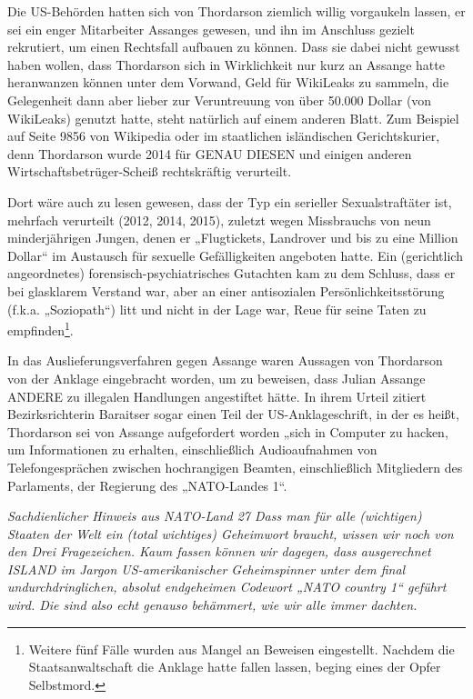 \begin{multicols}{2}
Die US-Behörden hatten sich von Thordarson ziemlich
willig vorgaukeln lassen, er sei ein enger Mitarbeiter Assanges gewesen, und ihn im Anschluss gezielt rekrutiert,
um einen Rechtsfall aufbauen zu können. Dass sie dabei nicht gewusst haben wollen, dass Thordarson sich
in Wirklichkeit nur kurz an Assange hatte heranwanzen
können unter dem Vorwand, Geld für WikiLeaks zu sammeln, die Gelegenheit dann aber lieber zur Veruntreuung von über 50.000 Dollar (von WikiLeaks) genutzt hatte, steht natürlich auf einem anderen Blatt. Zum Beispiel
auf Seite 9856 von Wikipedia oder im staatlichen isländischen Gerichtskurier, denn Thordarson wurde 2014 für
GENAU DIESEN und einigen anderen Wirtschaftsbetrüger-Scheiß rechtskräftig verurteilt.

Dort wäre auch zu lesen gewesen, dass der Typ ein serieller Sexualstraftäter ist, mehrfach verurteilt (2012, 2014,
2015), zuletzt wegen Missbrauchs von neun minderjährigen Jungen, denen er „Flugtickets, Landrover und bis
zu eine Million Dollar“ im Austausch für sexuelle Gefälligkeiten angeboten hatte. Ein (gerichtlich angeordnetes) forensisch-psychiatrisches Gutachten kam zu dem
Schluss, dass er bei glasklarem Verstand war, aber an
einer antisozialen Persönlichkeitsstörung (f.k.a. „Soziopath“) litt und nicht in der Lage war, Reue für seine Taten
zu empfinden\footnote[20]{Weitere fünf Fälle wurden aus Mangel an Beweisen eingestellt. Nachdem die Staatsanwaltschaft die Anklage
hatte fallen lassen, beging eines der Opfer Selbstmord.}.

In das Auslieferungsverfahren gegen Assange waren
Aussagen von Thordarson von der Anklage eingebracht
worden, um zu beweisen, dass Julian Assange ANDERE zu illegalen Handlungen angestiftet hätte. In ihrem
Urteil zitiert Bezirksrichterin Baraitser sogar einen Teil
der US-Anklageschrift, in der es heißt, Thordarson sei
von Assange aufgefordert worden „sich in Computer
zu hacken, um Informationen zu erhalten, einschließlich Audioaufnahmen von Telefongesprächen zwischen
hochrangigen Beamten, einschließlich Mitgliedern des
Parlaments, der Regierung des „NATO-Landes 1“.

\textit{Sachdienlicher Hinweis aus NATO-Land 27 
Dass man für alle (wichtigen) Staaten der Welt ein (total wichtiges) Geheimwort braucht, wissen wir noch von
den Drei Fragezeichen. Kaum fassen können wir dagegen,
dass ausgerechnet ISLAND im Jargon US-amerikanischer
Geheimspinner unter dem final undurchdringlichen, absolut endgeheimen Codewort „NATO country 1“ geführt
wird. Die sind also echt genauso behämmert, wie wir alle
immer dachten.
}


\end{multicols}
